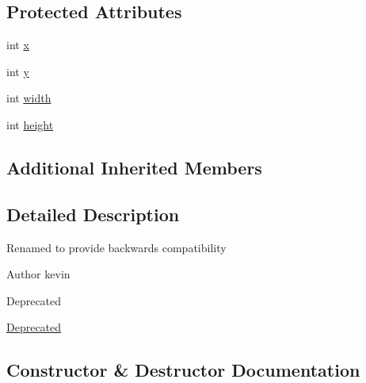 \subsection*{Protected Attributes}
\begin{DoxyCompactItemize}
\item 
int \mbox{\hyperlink{classorg_1_1newdawn_1_1slick_1_1gui_1_1_basic_component_ad0321d01a89b24e687e4e156fab90c67}{x}}
\item 
int \mbox{\hyperlink{classorg_1_1newdawn_1_1slick_1_1gui_1_1_basic_component_abca0dbce710368534eabb3f4168f47d5}{y}}
\item 
int \mbox{\hyperlink{classorg_1_1newdawn_1_1slick_1_1gui_1_1_basic_component_aa2eebd5f7be4f25b653ec4d34d0038e4}{width}}
\item 
int \mbox{\hyperlink{classorg_1_1newdawn_1_1slick_1_1gui_1_1_basic_component_aafa7e1a8dc8929407ade1a363d6754d7}{height}}
\end{DoxyCompactItemize}
\subsection*{Additional Inherited Members}


\subsection{Detailed Description}
Renamed to provide backwards compatibility

\begin{DoxyAuthor}{Author}
kevin 
\end{DoxyAuthor}
\begin{DoxyRefDesc}{Deprecated}
\item[\mbox{\hyperlink{deprecated__deprecated000002}{Deprecated}}]\end{DoxyRefDesc}


\subsection{Constructor \& Destructor Documentation}
\mbox{\label{classorg_1_1newdawn_1_1slick_1_1gui_1_1_basic_component_aa6ad193e274c3020c806f4a3cca1d65e}} 
